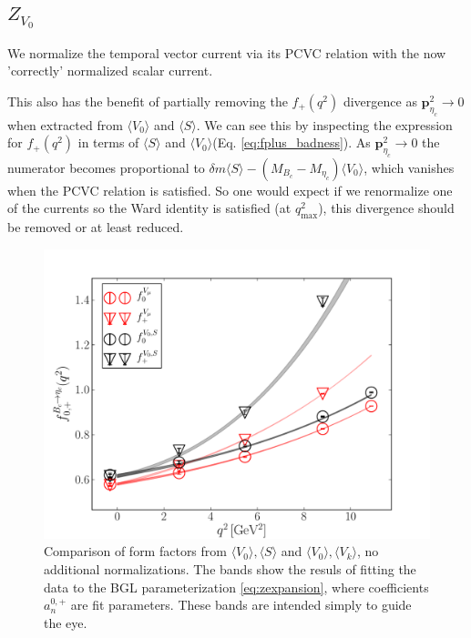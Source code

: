 \subsection{$Z_{V_0}$}
\label{sec:ZV0}

We normalize the temporal vector current via its PCVC relation with the now 'correctly' normalized scalar current.

This also has the benefit of partially removing the $f_+(q^2)$ divergence as ${\textbf{p}}^2_{\eta_c}\to 0$ when extracted from $\langle V_0 \rangle$ and $\langle S \rangle$. We can see this by inspecting the expression for $f_+(q^2)$ in terms of $\langle S \rangle$ and $\langle V_0 \rangle$(Eq. \eqref{eq:fplus_badness}). As ${\textbf{p}}_{\eta_c}^2 \to 0$ the numerator becomes proportional to $\delta m \langle S \rangle - (M_{B_c}-M_{\eta_c}) \langle V_0 \rangle$, which vanishes when the PCVC relation is satisfied. So one would expect if we renormalize one of the currents so the Ward identity is satisfied (at $q^2_{\text{max}}$), this divergence should be removed or at least reduced.

\begin{figure}[htb!]
\centering
\includegraphics[scale=0.55]{images/nrqcd/Bcetac_bothways_1.pdf}
\caption{Comparison of form factors from $\langle V_0 \rangle, \langle S \rangle$ and $\langle V_0 \rangle,\langle V_k \rangle$, no additional normalizations. The bands show the resuls of fitting the data to the BGL parameterization \eqref{eq:zexpansion}, where coefficients $a^{0,+}_n$ are fit parameters. These bands are intended simply to guide the eye. \label{fig:naive}}
\end{figure}

